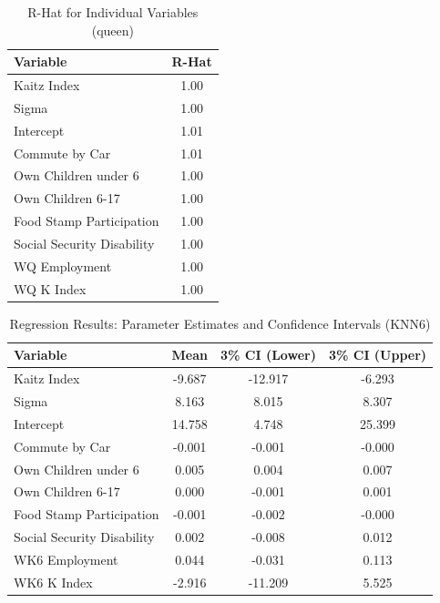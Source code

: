 \documentclass[12pt]{article}
\begin{document}
\begin{table}[H]
	\centering
	\begin{tabular}{lc}
		\toprule
		\textbf{Variable}          & \textbf{R-Hat} \\
		\midrule
		Kaitz Index                & 1.00           \\
		Sigma                      & 1.00           \\
		Intercept                  & 1.01           \\
		Commute by Car             & 1.01           \\
		Own Children under 6       & 1.00           \\
		Own Children 6-17          & 1.00           \\
		Food Stamp Participation   & 1.00           \\
		Social Security Disability & 1.00           \\
		WQ Employment              & 1.00           \\
		WQ K Index                 & 1.00           \\
		\bottomrule
	\end{tabular}
	\caption{R-Hat for Individual Variables (queen)}
\end{table}

\begin{table}[H]
	\centering
	\begin{tabular}{lccc}
		\toprule
		\textbf{Variable}          & \textbf{Mean} & \textbf{3\% CI (Lower)} & \textbf{3\% CI (Upper)} \\
		\midrule
		Kaitz Index                & -9.687        & -12.917                 & -6.293                  \\
		Sigma                      & 8.163         & 8.015                   & 8.307                   \\
		Intercept                  & 14.758        & 4.748                   & 25.399                  \\
		Commute by Car             & -0.001        & -0.001                  & -0.000                  \\
		Own Children under 6       & 0.005         & 0.004                   & 0.007                   \\
		Own Children 6-17          & 0.000         & -0.001                  & 0.001                   \\
		Food Stamp Participation   & -0.001        & -0.002                  & -0.000                  \\
		Social Security Disability & 0.002         & -0.008                  & 0.012                   \\
		WK6 Employment             & 0.044         & -0.031                  & 0.113                   \\
		WK6 K Index                & -2.916        & -11.209                 & 5.525                   \\
		\bottomrule
	\end{tabular}
	\caption{Regression Results: Parameter Estimates and Confidence Intervals (KNN6)}
\end{table}
\end{document}
